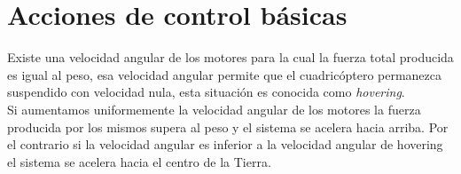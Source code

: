 \documentclass[main]{subfiles}
\begin{document}
\section{Acciones de control b\'asicas}
Existe una velocidad angular de los motores para la cual la fuerza total producida es igual al peso, esa velocidad angular permite que el cuadric\'optero permanezca suspendido con velocidad nula, esta situaci\'on es conocida como \emph{hovering}.\\ Si aumentamos uniformemente la velocidad angular de los motores la fuerza producida por los mismos supera al peso y el sistema se acelera hacia arriba. Por el contrario si la velocidad angular es inferior a la velocidad angular de hovering el sistema se acelera hacia el centro de la Tierra.\\
\begin{figure}
\centering
{}
\caption{}
\end{figure}
\end{document}
